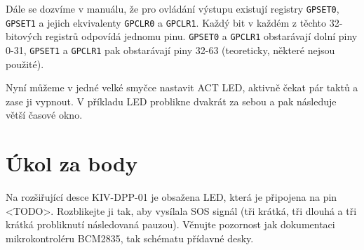 \documentclass{article}
\begin{document}
Dále se dozvíme v manuálu, že pro ovládání výstupu existují registry \texttt{GPSET0}, \texttt{GPSET1} a jejich ekvivalenty \texttt{GPCLR0} a \texttt{GPCLR1}. Každý bit v každém z těchto 32-bitových registrů odpovídá jednomu pinu. \texttt{GPSET0} a \texttt{GPCLR1} obstarávají dolní piny 0-31, \texttt{GPSET1} a \texttt{GPCLR1} pak obstarávají piny 32-63 (teoreticky, některé nejsou použité).

Nyní můžeme v jedné velké smyčce nastavit ACT LED, aktivně čekat pár taktů a zase ji vypnout. V příkladu LED problikne dvakrát za sebou a pak následuje větší časové okno.

\section{Úkol za body}

Na rozšiřující desce KIV-DPP-01 je obsažena LED, která je připojena na pin <TODO>. Rozblikejte ji tak, aby vysílala SOS signál (tři krátká, tři dlouhá a tři krátká probliknutí následovaná pauzou). Věnujte pozornost jak dokumentaci mikrokontroléru BCM2835, tak schématu přídavné desky.
\end{document}
